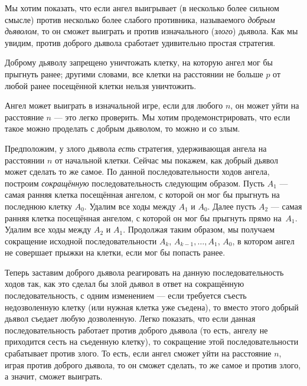 Мы хотим показать, что если ангел выигрывает (в несколько более сильном смысле) против несколько более слабого противника, называемого \emph{добрым дьяволом}, то он сможет выиграть и против изначального (\emph{злого}) дьявола.
Как мы увидим, против доброго дьявола сработает удивительно простая стратегия.

Доброму дьяволу запрещено уничтожать клетку, на которую ангел мог бы прыгнуть ранее;
другими словами, все клетки на расстоянии не больше $p$ от любой ранее посещённой клетки нельзя уничтожить.

Ангел может выиграть в изначальной игре, если для любого $n$, он может уйти на расстояние $n$ ---
это легко проверить.
Мы хотим продемонстрировать, что если такое можно проделать с добрым дьяволом, то можно и со злым.

Предположим, у злого дьявола \emph{есть} стратегия, удерживающая ангела на расстоянии $n$ от начальной клетки.
Сейчас мы покажем, как добрый дьявол может сделать то же самое.
По данной последовательности ходов ангела, построим \emph{сокращённую} последовательность следующим образом.
Пусть $A_1$ --- самая ранняя клетка посещённая ангелом, с которой он мог бы прыгнуть на последнюю клетку $A_0$.
Удалим все ходы между $A_1$ и $A_0$.
Далее пусть $A_2$ --- самая ранняя клетка посещённая ангелом, с которой он мог бы прыгнуть прямо на~$A_1$.
Удалим все ходы между $A_2$ и $A_1$.
Продолжая таким образом, мы получаем сокращение исходной последовательности $A_k$, $A_{k-1}, \dots, A_1$, $A_0$, в котором ангел не совершает прыжки на клетки, если мог бы попасть ранее.

Теперь заставим доброго дьявола реагировать на данную последовательность ходов так, как это сделал бы злой дьявол в ответ на сокращённую последовательность, с одним изменением --- если требуется съесть недозволенную клетку (или нужная клетка уже съедена), то вместо этого добрый дьявол съедает любую дозволенную.
Легко показать, что если данная последовательность работает против доброго дьявола (то есть, ангелу не приходится сесть на съеденную клетку), то сокращение этой последовательности срабатывает против злого.
То есть, если ангел сможет уйти на расстояние $n$, играя против доброго дьявола, то он сможет сделать, то же самое и против злого, а значит, сможет выиграть.

